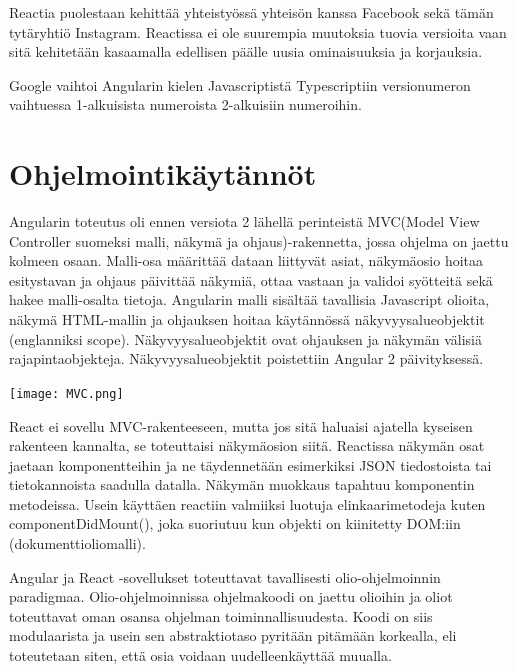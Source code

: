 \documentclass[a4paper,12pt,twoside]{article} %
\begin{document}
{\vspace{4mm}\noindent
Reactia puolestaan kehittää yhteistyössä yhteisön kanssa Facebook sekä tämän tytäryhtiö Instagram. Reactissa ei ole suurempia muutoksia tuovia versioita vaan sitä kehitetään kasaamalla edellisen päälle uusia ominaisuuksia ja korjauksia.

\vspace{4mm}\noindent
Google vaihtoi Angularin kielen Javascriptistä Typescriptiin versionumeron vaihtuessa 1-alkuisista numeroista 2-alkuisiin numeroihin.

\newpage

\section{Ohjelmointikäytännöt}
Angularin toteutus oli ennen versiota 2 lähellä perinteistä MVC(Model View Controller suomeksi malli, näkymä ja ohjaus)-rakennetta, jossa ohjelma on jaettu kolmeen osaan. Malli-osa määrittää dataan liittyvät asiat, näkymäosio hoitaa esitystavan ja ohjaus päivittää näkymiä, ottaa vastaan ja validoi syötteitä sekä hakee malli-osalta tietoja. Angularin malli sisältää tavallisia Javascript olioita, näkymä HTML-mallin ja ohjauksen hoitaa käytännössä näkyvyysalueobjektit (englanniksi scope). Näkyvyysalueobjektit ovat ohjauksen ja näkymän välisiä rajapintaobjekteja. Näkyvyysalueobjektit poistettiin Angular 2 päivityksessä.\cite{jgrcs}

\vspace{8mm}\noindent\texttt{[image: MVC.png]}

\vspace{8mm}\noindent
React ei sovellu MVC-rakenteeseen, mutta jos sitä haluaisi ajatella kyseisen rakenteen kannalta, se toteuttaisi näkymäosion siitä. Reactissa näkymän osat jaetaan komponentteihin ja ne täydennetään esimerkiksi JSON tiedostoista tai tietokannoista saadulla datalla. Näkymän muokkaus tapahtuu komponentin metodeissa. Usein käyttäen reactiin valmiiksi luotuja elinkaarimetodeja kuten componentDidMount(), joka suoriutuu kun objekti on kiinitetty DOM:iin (dokumenttioliomalli). \cite{react}

\vspace{4mm}\noindent
Angular ja React -sovellukset toteuttavat tavallisesti olio-ohjelmoinnin paradigmaa. Olio-ohjelmoinnissa ohjelmakoodi on jaettu olioihin ja oliot toteuttavat oman osansa ohjelman toiminnallisuudesta. \cite{oop} Koodi on siis modulaarista ja usein sen abstraktiotaso pyritään pitämään korkealla, eli toteutetaan siten, että osia voidaan uudelleenkäyttää muualla.



}
\end{document}
